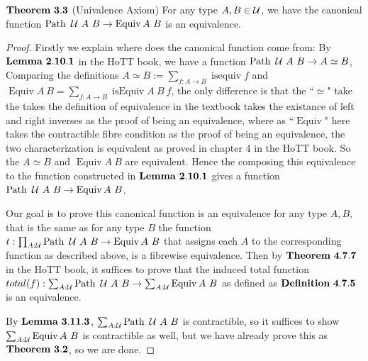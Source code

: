 \documentclass[11pt]{article}
\DeclareMathOperator{\Path}{Path}
\DeclareMathOperator{\Equiv}{Equiv}
\DeclareMathOperator{\isequiv}{isequiv}
\DeclareMathOperator{\isEquiv}{isEquiv}
\begin{document}
$\bf Theorem \ 3.3$ (Univalence Axiom) For any type $A,B\in {\cal U}$, we have the canonical function $\Path \ {\cal U} \ A \ B\to \Equiv A \ B$ is an equivalence.
\begin{proof}
	Firstly we explain where does the canonical function come from: By $\bf Lemma \ 2.10.1$ in the HoTT book, we have a function $\Path \ {\cal U} \ A \ B\to A\simeq B$, Comparing the definitions $A\simeq B:=\sum_{f:A\to B}\isequiv{f}$ and $\Equiv A \ B = \sum_{f:A\to B} \isEquiv A \ B \ f$, the only difference is that the ``$\simeq$" take the takes the definition of equivalence in the textbook takes the existance of left and right inverses as the proof of being an equivalence, where as ``$\Equiv$" here takes the contractible fibre condition as the proof of being an equivalence, the two characterization is equivalent as proved in chapter 4 in the HoTT book. So the $A\simeq B$ and $\Equiv A \ B$ are equivalent. Hence the composing this equivalence to the function constructed in $\bf Lemma \ 2.10.1$ gives a function $\Path \ {\cal U} \ A \ B\to \Equiv A \ B$.
	
    Our goal is to prove this canonical function is an equivalence for any type $A,B$, that is the same as for any type $B$ the function $t: \prod_{A: {\cal U}}\Path \ {\cal U} \ A \ B\to \Equiv A \ B$ that assigns each $A$ to the corresponding function as described above, is a fibrewise equivalence. Then by $\bf Theorem \ 4.7.7$ in the HoTT book, it suffices to prove that the induced total function $total(f):\sum_{A: {\cal U}} \Path \ {\cal U} \ A \ B \to \sum_{A:{\cal U}} \Equiv A \ B$ as defined as $\bf Definition \ 4.7.5$ is an equivalence. 
    
    By $\bf Lemma \ 3.11.3$, $\sum_{A: {\cal U}} \Path \ {\cal U} \ A \ B$ is contractible, so it suffices to show $\sum_{A:{\cal U}} \Equiv A \ B$ is contractible as well, but we have already prove this as $\bf Theorem \ 3.2$, so we are done.
\end{proof}
\end{document}
